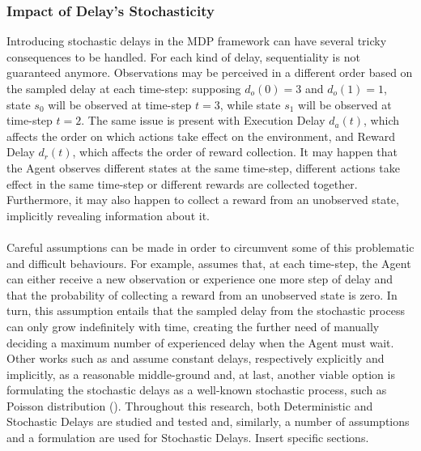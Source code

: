             
            \subsubsection{Impact of Delay's Stochasticity}
            Introducing stochastic delays in the MDP framework can have several tricky consequences to be handled. For each kind of delay, sequentiality is not guaranteed anymore. Observations may be perceived in a different order based on the sampled delay at each time-step: supposing $d_o(0) = 3$ and $d_o(1) = 1$, state $s_0$ will be observed at time-step $t=3$, while state $s_1$ will be observed at time-step $t=2$. The same issue is present with Execution Delay $d_a(t)$, which affects the order on which actions take effect on the environment, and Reward Delay $d_r(t)$, which affects the order of reward collection. It may happen that the Agent observes different states at the same time-step, different actions take effect in the same time-step or different rewards are collected together. Furthermore, it may also happen to collect a reward from an unobserved state, implicitly revealing information about it. \\\\
            Careful assumptions can be made in order to circumvent some of this problematic and difficult behaviours. For example,  assumes that, at each time-step, the Agent can either receive a new observation or experience one more step of delay and that the probability of collecting a reward from an unobserved state is zero. In turn, this assumption entails that the sampled delay from the stochastic process can only grow indefinitely with time, creating the further need of manually deciding a maximum number of experienced delay when the Agent must wait. Other works such as  and  assume constant delays, respectively explicitly and implicitly, as a reasonable middle-ground and, at last, another viable option is formulating the stochastic delays as a well-known stochastic process, such as Poisson distribution (). \newline
            Throughout this research, both Deterministic and Stochastic Delays are studied and tested and, similarly, a number of assumptions and a formulation are used for Stochastic Delays. \color{red} Insert specific sections\color{black}.
        
